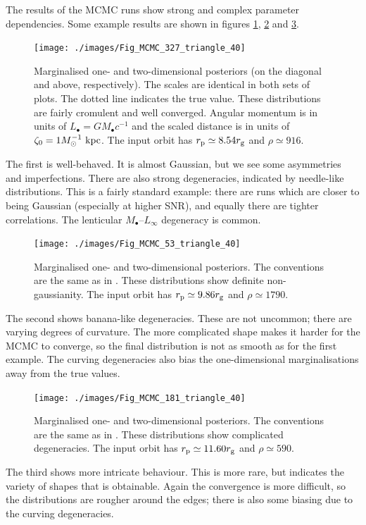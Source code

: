 The results of the MCMC runs show strong and complex parameter dependencies. Some example results are shown in figures \ref{fig:MCMC-1}, \ref{fig:MCMC-2} and \ref{fig:MCMC-3}.
\begin{figure}
\centering
\vspace{0.5\baselineskip}
   \texttt{[image: ./images/Fig\_MCMC\_327\_triangle\_40]}
\caption{Marginalised one- and two-dimensional posteriors (on the diagonal and above, respectively). The scales are identical in both sets of plots. The dotted line indicates the true value. These distributions are fairly cromulent and well converged. Angular momentum is in units of $L_\bullet = GM_\bullet c^{-1}$  and the scaled distance is in units of $\zeta_0 = 1 M_\odot^{-1}~\mathrm{kpc}$. The input orbit has $r_\mathrm{p} \simeq 8.54 r_\mathrm{g}$ and $\rho \simeq 916$.}
\label{fig:MCMC-1}
\end{figure}
The first is well-behaved. It is almost Gaussian, but we see some asymmetries and imperfections. There are also strong degeneracies, indicated by needle-like distributions. This is a fairly standard example: there are runs which are closer to being Gaussian (especially at higher SNR), and equally there are tighter correlations. The lenticular $M_\bullet$--$L_\infty$ degeneracy is common.

\begin{figure}
\centering
\vspace{0.5\baselineskip}
   \texttt{[image: ./images/Fig\_MCMC\_53\_triangle\_40]}
\caption{Marginalised one- and two-dimensional posteriors. The conventions are the same as in . These distributions show definite non-gaussianity. The input orbit has $r_\mathrm{p} \simeq 9.86 r_\mathrm{g}$ and $\rho \simeq 1790$.}
\label{fig:MCMC-2}
\end{figure}
The second shows banana-like degeneracies. These are not uncommon; there are varying degrees of curvature. The more complicated shape makes it harder for the MCMC to converge, so the final distribution is not as smooth as for the first example. The curving degeneracies also bias the one-dimensional marginalisations away from the true values.

\begin{figure}
\centering
\vspace{0.5\baselineskip}
   \texttt{[image: ./images/Fig\_MCMC\_181\_triangle\_40]}
\caption{Marginalised one- and two-dimensional posteriors. The conventions are the same as in . These distributions show complicated degeneracies. The input orbit has $r_\mathrm{p} \simeq 11.60 r_\mathrm{g}$ and $\rho \simeq 590$.}
\label{fig:MCMC-3}
\end{figure}
The third shows more intricate behaviour. This is more rare, but indicates the variety of shapes that is obtainable. Again the convergence is more difficult, so the distributions are rougher around the edges; there is also some biasing due to the curving degeneracies.

